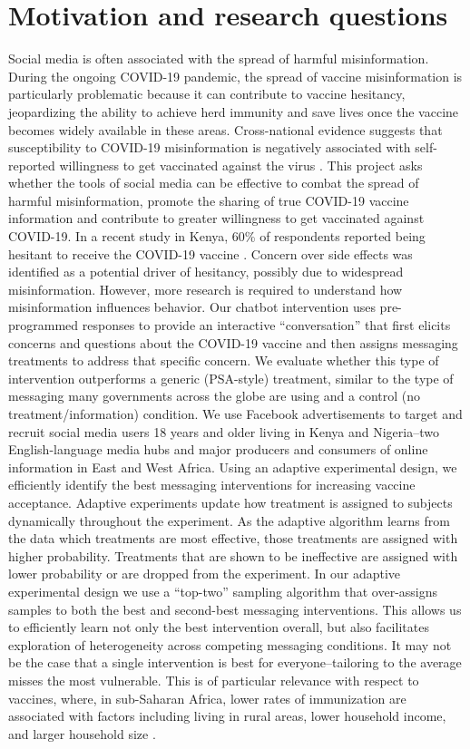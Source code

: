 \documentclass[letterpaper, 12pt, parskip=full,DIV=10]{scrartcl}
\begin{document}
\section{Motivation and research questions}
Social media is often associated with the spread of harmful misinformation. During the ongoing COVID-19 pandemic, the spread of vaccine misinformation is particularly problematic because it can contribute to vaccine hesitancy, jeopardizing the ability to achieve herd immunity and save lives once the vaccine becomes widely available in these areas. Cross-national evidence suggests that susceptibility to COVID-19 misinformation is negatively associated with self-reported willingness to get vaccinated against the virus \citep{roozenbeek2020susceptibility}. This project asks whether the tools of social media can be effective to combat the spread of harmful misinformation, promote the sharing of true COVID-19 vaccine information and contribute to greater willingness to get vaccinated against COVID-19. 
In a recent study in Kenya, 60\% of respondents reported being hesitant to receive the COVID-19 vaccine \citep{orangi2021assessing}. Concern over side effects was identified as a potential driver of hesitancy, possibly due to widespread misinformation. However, more research is required to understand how misinformation influences behavior. Our chatbot intervention uses pre-programmed responses to provide an interactive ``conversation'' that first elicits concerns and questions about the COVID-19 vaccine and then assigns messaging treatments to address that specific concern. We evaluate whether this type of intervention outperforms a generic (PSA-style) treatment, similar to the type of messaging many governments across the globe are using and a control (no treatment/information) condition.
We use Facebook advertisements to target and recruit social media users 18 years and older living in Kenya and Nigeria--two English-language media hubs and major producers and consumers of online information in East and West Africa. Using an adaptive experimental design, we efficiently identify the best messaging interventions for increasing vaccine acceptance. Adaptive experiments update how treatment is assigned to subjects dynamically throughout the experiment. As the adaptive algorithm learns from the data which treatments are most effective, those treatments are assigned with higher probability. Treatments that are shown to be ineffective are assigned with lower probability or are dropped from the experiment. 
In our adaptive experimental design we use a ``top-two'' sampling algorithm that over-assigns samples to both the best and second-best messaging interventions. This allows us to efficiently learn not only the best intervention overall, but also facilitates exploration of heterogeneity across competing messaging conditions. It may not be the case that a single intervention is best for everyone--tailoring to the average misses the most vulnerable. This is of particular relevance with respect to vaccines, where, in sub-Saharan Africa, lower rates of immunization are associated with factors including living in rural areas, lower household income, and larger household size \citep{ameyaw2021decomposing}. 
\end{document}
